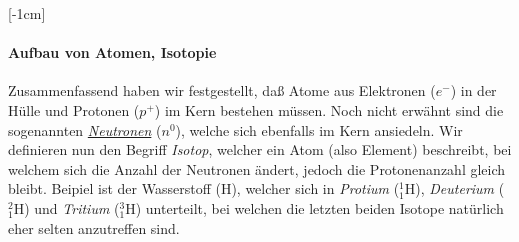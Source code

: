 \documentclass{subfiles}
\begin{document}
    [-1cm]
    \paragraph*{Aufbau von Atomen, Isotopie}
        Zusammenfassend haben wir festgestellt, daß Atome aus Elektronen ($e^-$) in der Hülle und Protonen ($p^+$) im Kern bestehen müssen. Noch nicht erwähnt sind die sogenannten \href{https://de.wikipedia.org/wiki/Neutron}{\emph{Neutronen}} ($n^0$), welche sich ebenfalls im Kern ansiedeln. Wir definieren nun den Begriff \emph{Isotop}, welcher ein Atom (also Element) beschreibt, bei welchem sich die Anzahl der Neutronen ändert, jedoch die Protonenanzahl gleich bleibt. Beipiel ist der Wasserstoff (H), welcher sich in \emph{Protium} ($^1_1\text{H}$), \emph{Deuterium} ($^2_1\text{H}$) und \emph{Tritium} ($^3_1\text{H}$) unterteilt, bei welchen die letzten beiden Isotope natürlich eher selten anzutreffen sind. 
\end{document}
